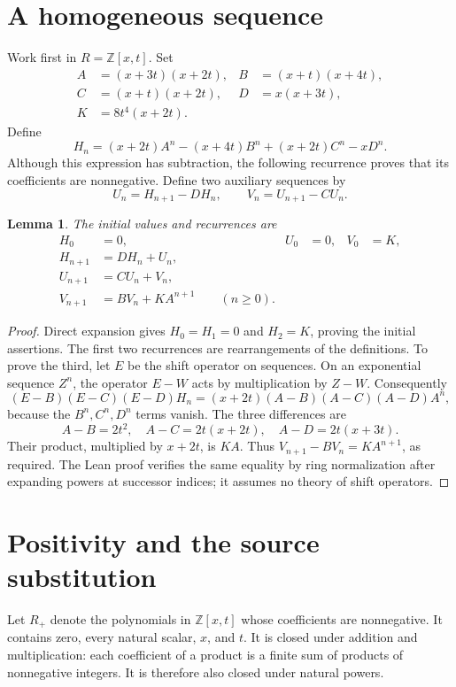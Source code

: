 \documentclass[11pt]{article}
\newtheorem{lemma}[theorem]{Lemma}
\newcommand{\ZZ}{\mathbb Z}
\begin{document}
\section{A homogeneous sequence}
Work first in $R=\ZZ[x,t]$. Set
\begin{align*}
 A&=(x+3t)(x+2t),& B&=(x+t)(x+4t),\\
 C&=(x+t)(x+2t),& D&=x(x+3t),\\
 K&=8t^4(x+2t).
\end{align*}
Define
\[
H_n=(x+2t)A^n-(x+4t)B^n+(x+2t)C^n-xD^n.
\]
Although this expression has subtraction, the following recurrence proves that its coefficients are nonnegative.
Define two auxiliary sequences by
\[
U_n=H_{n+1}-DH_n,\qquad V_n=U_{n+1}-CU_n.
\]
\begin{lemma}\label{lem:rec}
The initial values and recurrences are
\begin{align*}
H_0&=0,&U_0&=0,&V_0&=K,\\
H_{n+1}&=DH_n+U_n,\\
U_{n+1}&=CU_n+V_n,\\
V_{n+1}&=BV_n+KA^{n+1} \qquad(n\geq0).
\end{align*}
\end{lemma}
\begin{proof}
Direct expansion gives $H_0=H_1=0$ and $H_2=K$, proving the initial assertions. The first two recurrences are rearrangements of the definitions. To prove the third, let $E$ be the shift operator on sequences. On an exponential sequence $Z^n$, the operator $E-W$ acts by multiplication by $Z-W$. Consequently
\[
(E-B)(E-C)(E-D)H_n=(x+2t)(A-B)(A-C)(A-D)A^n,
\]
because the $B^n,C^n,D^n$ terms vanish. The three differences are
\[
 A-B=2t^2,\quad A-C=2t(x+2t),\quad A-D=2t(x+3t).
\]
Their product, multiplied by $x+2t$, is $KA$. Thus
$V_{n+1}-BV_n=KA^{n+1}$, as required. The Lean proof verifies the same equality by ring normalization after expanding powers at successor indices; it assumes no theory of shift operators.
\end{proof}

\section{Positivity and the source substitution}
Let $R_+$ denote the polynomials in $\ZZ[x,t]$ whose coefficients are nonnegative. It contains zero, every natural scalar, $x$, and $t$. It is closed under addition and multiplication: each coefficient of a product is a finite sum of products of nonnegative integers. It is therefore also closed under natural powers.
\end{document}
